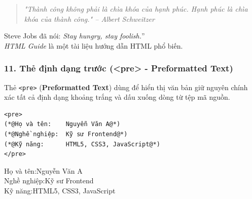 \documentclass[11pt,oneside]{book}
\newcommand{\codeinline}[1]{\textcolor{accentOrange}{\texttt{#1}}}
\begin{document}
\begin{tcolorbox}[
    enhanced,
    colback=white,
    colframe=primaryBlue!20,
    arc=6pt,
    boxrule=0.8pt,
    drop shadow=black!3!white,
    top=8pt, bottom=8pt, left=12pt, right=12pt,
    title={\sffamily\bfseries\scriptsize\color{codeComment} KẾT QUẢ HIỂN THỊ TRÊN TRÌNH DUYỆT (BROWSER PREVIEW)},
    coltitle=codeComment,
    colbacktitle=codeBg!80!white
]
\begin{quote}
\itshape "Thành công không phải là chìa khóa của hạnh phúc. Hạnh phúc là chìa khóa của thành công." -- Albert Schweitzer
\end{quote}
Steve Jobs đã nói: \codeinline{}\textit{Stay hungry, stay foolish.}''\\[3pt]
\textit{HTML Guide} là một tài liệu hướng dẫn HTML phổ biến.
\end{tcolorbox}


\subsubsection{11. Thẻ định dạng trước (<pre> - Preformatted Text)}

Thẻ \codeinline{<pre>} (\textbf{Preformatted Text}) dùng để hiển thị văn bản giữ nguyên chính xác tất cả định dạng khoảng trắng và dấu xuống dòng từ tệp mã nguồn.

\begin{codeWindow}
\begin{lstlisting}[language=HTML5]
<pre>
(*@Họ và tên:    Nguyễn Văn A@*)
(*@Nghề nghiệp:  Kỹ sư Frontend@*)
(*@Kỹ năng:      HTML5, CSS3, JavaScript@*)
</pre>
\end{lstlisting}
\end{codeWindow}
\begin{tcolorbox}[
    enhanced,
    colback=white,
    colframe=primaryBlue!20,
    arc=6pt,
    boxrule=0.8pt,
    drop shadow=black!3!white,
    top=8pt, bottom=8pt, left=12pt, right=12pt,
    title={\sffamily\bfseries\scriptsize\color{codeComment} KẾT QUẢ HIỂN THỊ TRÊN TRÌNH DUYỆT (MONOSPACE ALIGNMENT PREVIEW)},
    coltitle=codeComment,
    colbacktitle=codeBg!80!white
]
{\ttfamily
Họ và tên:\hspace{1.2cm}Nguyễn Văn A\\
Nghề nghiệp:\hspace{1.0cm}Kỹ sư Frontend\\
Kỹ năng:\hspace{1.4cm}HTML5, CSS3, JavaScript
}
\end{tcolorbox}
\end{document}
